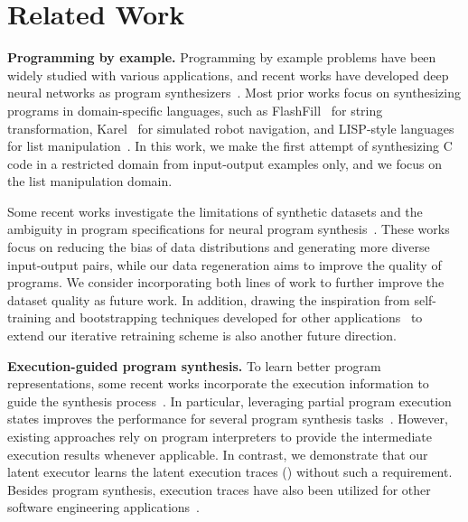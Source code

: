 \section{Related Work}
\label{sec:work}

\textbf{Programming by example.} Programming by example problems have been widely studied with various applications, and recent works have developed deep neural networks as program synthesizers~\cite{gulwani2012spreadsheet,parisotto2016neuro,devlin2017robustfill,bunel2018leveraging}. Most prior works focus on synthesizing programs in domain-specific languages, such as FlashFill~\cite{parisotto2016neuro,devlin2017robustfill,vijayakumar2018neural} for string transformation, Karel~\cite{bunel2018leveraging,shin2018improving,chen2018execution,gupta2020synthesize} for simulated robot navigation, and LISP-style languages for list manipulation~\cite{balog2016deepcoder,polosukhin2018neural,Zohar2018AutomaticPSExtendExecution,nye2019learning}. In this work, we make the first attempt of synthesizing C code in a restricted domain from input-output examples only, and we focus on the list manipulation domain.

Some recent works investigate the limitations of synthetic datasets and the ambiguity in program specifications for neural program synthesis~\cite{shin2019synthetic,clymo2020data,suh2020creating,laich2019guiding}. These works focus on reducing the bias of data distributions and generating more diverse input-output pairs, while our data regeneration aims to improve the quality of programs. We consider incorporating both lines of work to further improve the dataset quality as future work. In addition, drawing the inspiration from self-training and bootstrapping techniques developed for other applications~\cite{mooney1993bootstrapping,abney2002bootstrapping,mcclosky2006effective,xie2020self} to extend our iterative retraining scheme is also another future direction.

\textbf{Execution-guided program synthesis.} To learn better program representations, some recent works incorporate the execution information to guide the synthesis process~\cite{sun2018neural,Zohar2018AutomaticPSExtendExecution,shin2018improving,chen2018execution,Ellis2019WriteEAExtendExecution,tian2019learning,balog2020neural,gupta2020synthesize,odena2020bustle,nye2020representing,mandal2021learning}. In particular, leveraging partial program execution states improves the performance for several program synthesis tasks~\cite{chen2018execution,Zohar2018AutomaticPSExtendExecution,Ellis2019WriteEAExtendExecution,nye2020representing}. However, existing approaches rely on program interpreters to provide the intermediate execution results whenever applicable. In contrast, we demonstrate that our latent executor learns the latent execution traces (\laet{}) without such a requirement. Besides program synthesis, execution traces have also been utilized for other software engineering applications~\cite{alam2019zero,mendis2019ithemal}.

